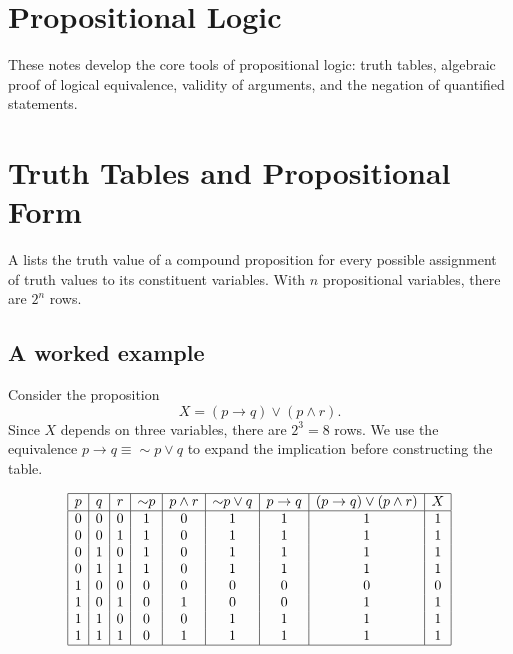 \section{Propositional Logic}

These notes develop the core tools of propositional logic: truth tables,
algebraic proof of logical equivalence, validity of arguments, and the
negation of quantified statements.

\section{Truth Tables and Propositional Form}

A  lists the truth value of a compound proposition for every
possible assignment of truth values to its constituent variables. With $n$
propositional variables, there are $2^n$ rows.

\subsection{A worked example}

Consider the proposition
\[
    X = (p \to q) \lor (p \land r).
\]
Since $X$ depends on three variables, there are $2^3 = 8$ rows. We use the
equivalence $p \to q \equiv {\sim}p \lor q$ to expand the implication before
constructing the table.

\[
\begin{array}{|c|c|c|c|c|c|c|c|c|}
    \hline
    p & q & r & {\sim}p & p \land r & {\sim}p \lor q & p \to q
      & (p \to q) \lor (p \land r) & X \\
    \hline
    0 & 0 & 0 & 1 & 0 & 1 & 1 & 1 & 1 \\
    0 & 0 & 1 & 1 & 0 & 1 & 1 & 1 & 1 \\
    0 & 1 & 0 & 1 & 0 & 1 & 1 & 1 & 1 \\
    0 & 1 & 1 & 1 & 0 & 1 & 1 & 1 & 1 \\
    1 & 0 & 0 & 0 & 0 & 0 & 0 & 0 & 0 \\
    1 & 0 & 1 & 0 & 1 & 0 & 0 & 1 & 1 \\
    1 & 1 & 0 & 0 & 0 & 1 & 1 & 1 & 1 \\
    1 & 1 & 1 & 0 & 1 & 1 & 1 & 1 & 1 \\
    \hline
\end{array}
\]

